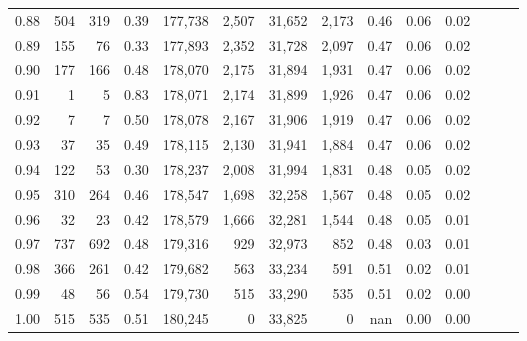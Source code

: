 \begin{tabular}{rrrrrrrrrrrrrr}
0.88 &     504 &    319 &  0.39 &  177,738 &    2,507 &  31,652 &   2,173 &  0.46 &  0.06 &      0.02 \\
0.89 &     155 &     76 &  0.33 &  177,893 &    2,352 &  31,728 &   2,097 &  0.47 &  0.06 &      0.02 \\
0.90 &     177 &    166 &  0.48 &  178,070 &    2,175 &  31,894 &   1,931 &  0.47 &  0.06 &      0.02 \\
0.91 &       1 &      5 &  0.83 &  178,071 &    2,174 &  31,899 &   1,926 &  0.47 &  0.06 &      0.02 \\
0.92 &       7 &      7 &  0.50 &  178,078 &    2,167 &  31,906 &   1,919 &  0.47 &  0.06 &      0.02 \\
0.93 &      37 &     35 &  0.49 &  178,115 &    2,130 &  31,941 &   1,884 &  0.47 &  0.06 &      0.02 \\
0.94 &     122 &     53 &  0.30 &  178,237 &    2,008 &  31,994 &   1,831 &  0.48 &  0.05 &      0.02 \\
0.95 &     310 &    264 &  0.46 &  178,547 &    1,698 &  32,258 &   1,567 &  0.48 &  0.05 &      0.02 \\
0.96 &      32 &     23 &  0.42 &  178,579 &    1,666 &  32,281 &   1,544 &  0.48 &  0.05 &      0.01 \\
0.97 &     737 &    692 &  0.48 &  179,316 &      929 &  32,973 &     852 &  0.48 &  0.03 &      0.01 \\
0.98 &     366 &    261 &  0.42 &  179,682 &      563 &  33,234 &     591 &  0.51 &  0.02 &      0.01 \\
0.99 &      48 &     56 &  0.54 &  179,730 &      515 &  33,290 &     535 &  0.51 &  0.02 &      0.00 \\
1.00 &     515 &    535 &  0.51 &  180,245 &        0 &  33,825 &       0 &   nan &  0.00 &      0.00 \\
\bottomrule
\end{tabular}
